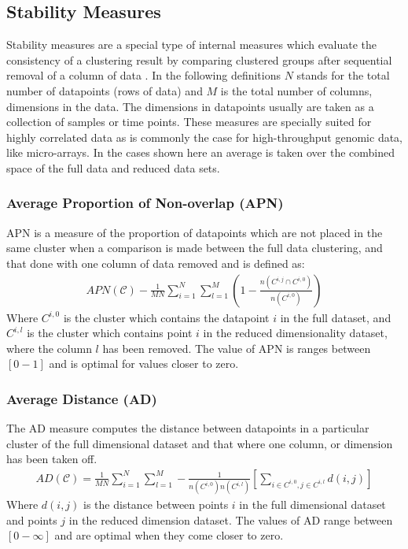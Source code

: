 \subsection{Stability Measures}
Stability  measures are  a  special type  of  internal measures  which
evaluate the consistency of a clustering result by comparing clustered
groups after sequential removal  of a column of data \cite{datta2003}.
In  the following  definitions  $N$  stands for  the  total number  of
datapoints  (rows of data)  and $M$  is the  total number  of columns,
dimensions  in the  data.  The  dimensions in  datapoints  usually are
taken as  a collection of samples  or time points.  These measures are
specially suited  for highly correlated  data as is commonly  the case
for  high-throughput genomic  data,  like micro-arrays.  In the  cases
shown here an average is taken over the combined space of the full
data and reduced data sets.

\subsubsection{Average Proportion of Non-overlap (APN)}
APN is a measure of the  proportion of datapoints which are not placed
in the  same cluster when a  comparison is made between  the full data
clustering,  and that  done with  one column  of data  removed  and is
defined as:
\begin{gather}
APN(\mathcal{C}) - \frac{1}{MN} \sum_{i=1}^{N}\sum_{l=1}^{M} \left( 1
- \frac{n(C^{i,j} \cap C^{i,0})}{n(C^{i,0})} \right)
\end{gather}  
Where $C^{i,0}$ is the cluster which contains the datapoint $i$ in the
full dataset, and $C^{i,l}$ is the cluster which contains point $i$ in
the  reduced dimensionality  dataset, where  the column  $l$  has been
removed.  The  value of APN is  ranges between $[0-1]$  and is optimal
for values closer to zero.


\subsubsection{Average Distance (AD)}
The  AD  measure  computes   the  distance  between  datapoints  in  a
particular cluster of the full  dimensional dataset and that where one
column, or dimension has been taken off.
\begin{gather}
AD(\mathcal{C})=\frac{1}{MN}       \sum_{i=1}^{N}\sum_{l=1}^{M}      -
\frac{1}{n(C^{i,0})n(C^{i,l})}  \left[  \sum_{i  \in  C^{i,0},  j  \in
    C^{i,l}} d(i,j) \right]
\end{gather}
Where $d(i,j)$ is the distance between points $i$ in the full dimensional
dataset and points $j$ in the reduced dimension dataset.
The values of AD range  between $[0-\infty]$ and are optimal when they
come closer to zero.

